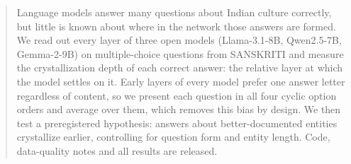 \begin{abstract}
Language models answer many questions about Indian culture correctly, but little is known about where in the network those answers are formed.
We read out every layer of three open models (Llama-3.1-8B, Qwen2.5-7B, Gemma-2-9B) on \nAnalysis{} multiple-choice questions from SANSKRITI and measure the crystallization depth of each correct answer: the relative layer at which the model settles on it.
Early layers of every model prefer one answer letter regardless of content, so we present each question in all four cyclic option orders and average over them, which removes this bias by design.
We then test a preregistered hypothesis: answers about better-documented entities crystallize earlier, controlling for question form and entity length.
Code, data-quality notes and all results are released.
\end{abstract}
